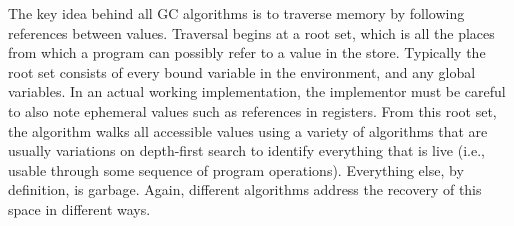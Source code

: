
The key idea behind all GC algorithms is to traverse memory by following
references between values. Traversal begins at a root set, which is all the
places from which a program can possibly refer to a value in the store.
Typically the root set consists of every bound variable in the environment, and
any global variables. In an actual working implementation, the implementor must
be careful to also note ephemeral values such as references in registers. From
this root set, the algorithm walks all accessible values using a variety of
algorithms that are usually variations on depth-first search to identify
everything that is live (i.e., usable through some sequence of program
operations). Everything else, by definition, is garbage. Again, different
algorithms address the recovery of this space in different ways.
